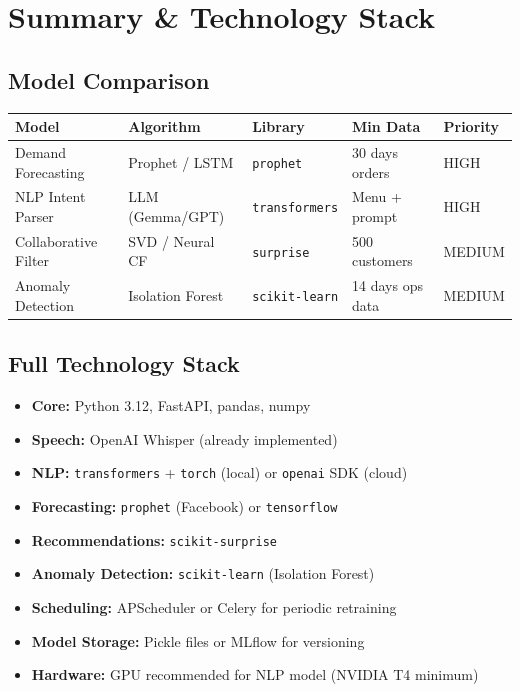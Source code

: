 \documentclass[12pt, a4paper]{article}
\begin{document}
\newpage
\section{Summary \& Technology Stack}

\subsection{Model Comparison}

\begin{center}
\begin{tabular}{lllll}
\toprule
\textbf{Model} & \textbf{Algorithm} & \textbf{Library} & \textbf{Min Data} & \textbf{Priority} \\
\midrule
Demand Forecasting   & Prophet / LSTM       & \texttt{prophet}    & 30 days orders     & HIGH \\
NLP Intent Parser    & LLM (Gemma/GPT)      & \texttt{transformers} & Menu + prompt    & HIGH \\
Collaborative Filter & SVD / Neural CF      & \texttt{surprise}   & 500 customers      & MEDIUM \\
Anomaly Detection    & Isolation Forest     & \texttt{scikit-learn} & 14 days ops data & MEDIUM \\
\bottomrule
\end{tabular}
\end{center}


\subsection{Full Technology Stack}

\begin{itemize}[nosep]
    \item \textbf{Core:} Python 3.12, FastAPI, pandas, numpy
    \item \textbf{Speech:} OpenAI Whisper (already implemented)
    \item \textbf{NLP:} \texttt{transformers} + \texttt{torch} (local) or \texttt{openai} SDK (cloud)
    \item \textbf{Forecasting:} \texttt{prophet} (Facebook) or \texttt{tensorflow}
    \item \textbf{Recommendations:} \texttt{scikit-surprise}
    \item \textbf{Anomaly Detection:} \texttt{scikit-learn} (Isolation Forest)
    \item \textbf{Scheduling:} APScheduler or Celery for periodic retraining
    \item \textbf{Model Storage:} Pickle files or MLflow for versioning
    \item \textbf{Hardware:} GPU recommended for NLP model (NVIDIA T4 minimum)
\end{itemize}
\end{document}
